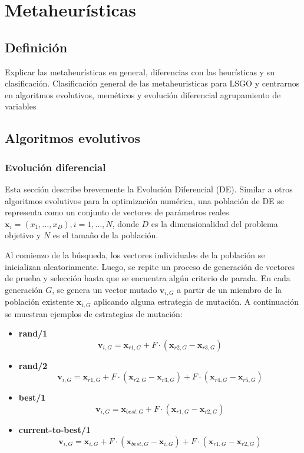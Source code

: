 
\chapter{Metaheurísticas}

\section{Definición}
Explicar las metaheurísticas en general, diferencias con las heurísticas y su clasificación. Clasificación general de las metaheuristicas para LSGO y centrarnos en algoritmos evolutivos, meméticos y evolución diferencial agrupamiento de variables

\section{Algoritmos evolutivos}

\subsection{Evolución diferencial}

Esta sección describe brevemente la Evolución Diferencial (DE). Similar a otros algoritmos evolutivos para la optimización numérica, una población de DE se representa como un conjunto de vectores de parámetros reales \( \mathbf{x}_i = (x_{1}, \ldots, x_{D}), i = 1, \ldots, N \), donde \( D \) es la dimensionalidad del problema objetivo y \( N \) es el tamaño de la población. 

Al comienzo de la búsqueda, los vectores individuales de la población se inicializan aleatoriamente. Luego, se repite un proceso de generación de vectores de prueba y selección hasta que se encuentra algún criterio de parada. En cada generación \( G \), se genera un vector mutado \( \mathbf{v}_{i,G} \) a partir de un miembro de la población existente \( \mathbf{x}_{i,G} \) aplicando alguna estrategia de mutación. A continuación se muestran ejemplos de estrategias de mutación:

\begin{itemize}
    \item \textbf{rand/1}
    \[
    \mathbf{v}_{i,G} = \mathbf{x}_{r1,G} + F \cdot (\mathbf{x}_{r2,G} - \mathbf{x}_{r3,G})
    \]

    \item \textbf{rand/2}
    \[
    \mathbf{v}_{i,G} = \mathbf{x}_{r1,G} + F \cdot (\mathbf{x}_{r2,G} - \mathbf{x}_{r3,G}) + F \cdot (\mathbf{x}_{r4,G} - \mathbf{x}_{r5,G})
    \]

    \item \textbf{best/1}
    \[
    \mathbf{v}_{i,G} = \mathbf{x}_{best,G} + F \cdot (\mathbf{x}_{r1,G} - \mathbf{x}_{r2,G})
    \]

    \item \textbf{current-to-best/1}
    \[
    \mathbf{v}_{i,G} = \mathbf{x}_{i,G} + F \cdot (\mathbf{x}_{best,G} - \mathbf{x}_{i,G}) + F \cdot (\mathbf{x}_{r1,G} - \mathbf{x}_{r2,G})
    \]
\end{itemize}

